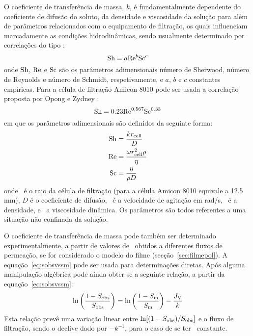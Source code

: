 O coeficiente de transferência de massa, $k$, é fundamentalmente dependente do coeficiente de difusão do soluto, da densidade e viscosidade da solução para além de parâmetros relacionados com o equipamento de filtração, os quais influenciam marcadamente as condições hidrodinâmicas, sendo usualmente determinado por correlações do tipo \cite{mulder}:
\begin{equation}
	\label{eq:k_mulder}
	\mathrm{Sh}=a\mathrm{Re}^b\mathrm{Sc}^c    	
\end{equation}
onde $\mathrm{Sh}$, $\mathrm{Re}$ e $\mathrm{Sc}$ são os parâmetros adimensionais número de Sherwood, número de Reynolds e número de Schmidt, respetivamente, e $a$, $b$ e $c$ constantes empíricas. Para a célula de filtração Amicon 8010 pode ser usada a correlação proposta por Opong e Zydney \cite{opong}:
\begin{equation}
	\label{eq:pra_opong}
	\mathrm{Sh} = 0.23 \mathrm{Re}^{0.567} \mathrm{Sc}^{0.33}
\end{equation}
em que os parâmetros adimensionais são definidos da seguinte forma:
\begin{equation}
\begin{aligned}
	\mr{Sh}   & = \frac{k\raiocelula}{D} \\
  \reynolds & = \frac{\agitacao\raiocelula^2\densidade}%
		{\viscosidade} \\
	\mr{Sc}   & = \frac{\viscosidade}{\densidade D}
\end{aligned}
\end{equation}
onde \raiocelula\ é o raio da célula de filtração (para a célula Amicon 8010 equivale a 12.5\,mm), $D$ é o coeficiente de difusão, \agitacao\ é a velocidade de agitação em rad/s, \densidade\ é a densidade, e \viscosidade\ a viscosidade dinâmica. Os parâmetros são todos referentes a uma situação não-confinada da solução.

O coeficiente de transferência de massa pode também ser determinado experimentalmente, a partir de valores de \permobs\ obtidos a diferentes fluxos de permeação, se for considerado o modelo do filme (secção~\ref{sec:filmepol}). A equação~\ref{eq:sobsvssm} pode ser usada para determinações diretas. Após alguma manipulação algébrica pode ainda obter-se a seguinte relação, a partir da equação~\ref{eq:sobsvssm}:
\begin{equation}
	\label{eq:pra_sobs2sm_lin}
	\ln \left( \frac{1-S_{\mathrm{obs}}}{S_{\mathrm{obs}}} \right) = 
	\ln \left( \frac{1-S_{\mathrm{m}}}{S_{\mathrm{m}}} \right) - \frac{J_{\mathrm{V}}}{k}	
\end{equation}
% 
Esta relação prevê uma variação linear entre $\ln[(1-S_{\mathrm{obs}})/S_{\mathrm{obs}}]$ e o fluxo de filtração, sendo o declive dado por $-k^{-1}$, para o caso de se ter \permm\ constante.

